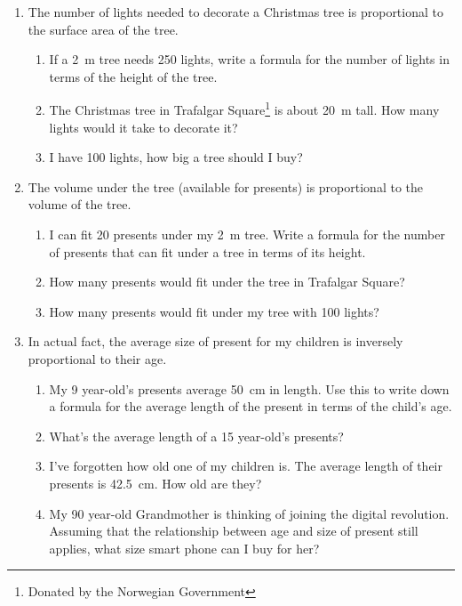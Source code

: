 \documentclass{article}
\begin{document}
\begin{enumerate}
\item The number of lights needed to decorate a Christmas tree is proportional to the surface area of the tree.

\begin{enumerate}
\item If a \SI{2}{m} tree needs \num{250} lights, write a formula for the number of lights in terms of the height of the tree.
\item The Christmas tree in Trafalgar Square\footnote{Donated by the Norwegian Government} is about \SI{20}{m} tall.
How many lights would it take to decorate it?
\item I have \num{100} lights, how big a tree should I buy?
\end{enumerate}

\item The volume under the tree (available for presents) is proportional to the volume of the tree.

\begin{enumerate}
\item I can fit \num{20} presents under my \SI{2}{m} tree.
Write a formula for the number of presents that can fit under a tree in terms of its height.
\item How many presents would fit under the tree in Trafalgar Square?
\item How many presents would fit under my tree with \num{100} lights?
\end{enumerate}

\item In actual fact, the average size of present for my children is inversely proportional to their age.

\begin{enumerate}
\item My \num{9} year-old's presents average \SI{50}{cm} in length.
Use this to write down a formula for the average length of the present in terms of the child's age.
\item What's the average length of a \num{15} year-old's presents?
\item I've forgotten how old one of my children is.
The average length of their presents is \SI{42.5}{cm}.
How old are they?
\item My \num{90} year-old Grandmother is thinking of joining the digital revolution.
Assuming that the relationship between age and size of present still applies, what size smart phone can I buy for her?
\end{enumerate}


\end{enumerate}
\end{document}
